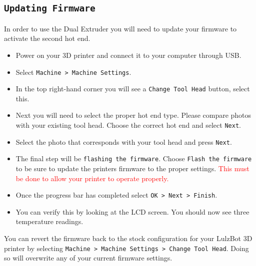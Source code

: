 \subsection{\texttt{Updating Firmware}}
In order to use the Dual Extruder you will need to update your firmware to activate the second hot end.

\begin{itemize}
\item Power on your 3D printer and connect it to your computer through USB.
\item Select \texttt{Machine > Machine Settings}.
\item In the top right-hand corner you will see a \texttt{Change Tool Head} button, select this. 
\item Next you will need to select the proper hot end type. Please compare photos with your existing tool head. Choose the correct hot end and select \texttt{Next}.
\item Select the photo that corresponds with your tool head and press \texttt{Next}.
\item The final step will be \texttt{flashing the firmware}. Choose \texttt{Flash the firmware} to be sure to update the printers firmware to the proper settings. \textcolor{red}{This must be done to allow your printer to operate properly.}
\item Once the progress bar has completed select \texttt{OK > Next > Finish}.  
\item You can verify this by looking at the LCD screen. You should now see three temperature readings. 
\end{itemize} 
You can revert the firmware back to the stock configuration for your LulzBot\textsuperscript{\miniscule{\texttrademark}} 3D printer by selecting \texttt{Machine > Machine Settings > Change Tool Head}. Doing so will overwrite any of your current firmware settings.
